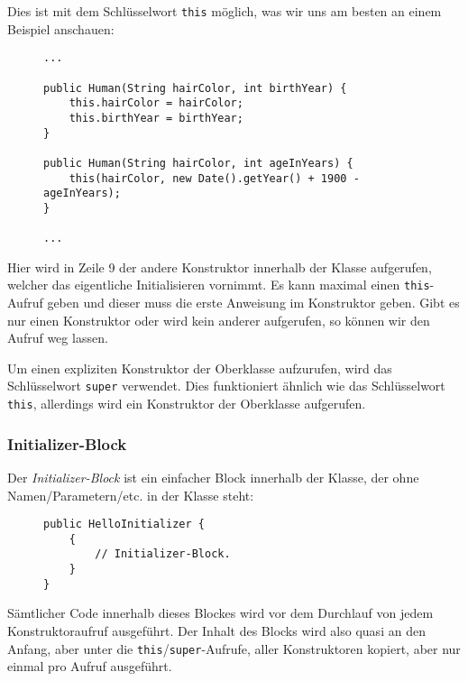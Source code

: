 		Dies ist mit dem Schlüsselwort \lstinline|this| möglich, was wir uns am besten an einem Beispiel anschauen:
		\begin{figure}[H]
			\centering
			\begin{lstlisting}
...

public Human(String hairColor, int birthYear) {
	this.hairColor = hairColor;
	this.birthYear = birthYear;
}

public Human(String hairColor, int ageInYears) {
	this(hairColor, new Date().getYear() + 1900 - ageInYears);
}

...
\end{lstlisting}
		\end{figure}
		Hier wird in Zeile 9 der andere Konstruktor innerhalb der Klasse aufgerufen, welcher das eigentliche Initialisieren vornimmt. Es kann maximal einen \lstinline|this|-Aufruf geben und dieser muss die erste Anweisung im Konstruktor geben. Gibt es nur einen Konstruktor oder wird kein anderer aufgerufen, so können wir den Aufruf weg lassen.
		
		Um einen expliziten Konstruktor der Oberklasse aufzurufen, wird das Schlüsselwort \lstinline|super| verwendet. Dies funktioniert ähnlich wie das Schlüsselwort \lstinline|this|, allerdings wird ein Konstruktor der Oberklasse aufgerufen.
		
	
	\subsubsection{Initializer-Block}
		Der \textit{Initializer-Block} ist ein einfacher Block innerhalb der Klasse, der ohne Namen/Parametern/etc. in der Klasse steht:
		\begin{figure}[H]
			\centering
			\begin{lstlisting}
public HelloInitializer {
	{
		// Initializer-Block.
	}
}
\end{lstlisting}
		\end{figure}
		Sämtlicher Code innerhalb dieses Blockes wird vor dem Durchlauf von jedem Konstruktoraufruf ausgeführt. Der Inhalt des Blocks wird also quasi an den Anfang, aber unter die \lstinline|this|/\lstinline|super|-Aufrufe, aller Konstruktoren kopiert, aber nur einmal pro Aufruf ausgeführt.
	
